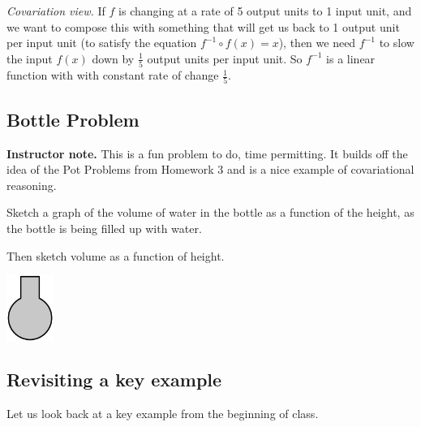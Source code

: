 \documentclass[11pt]{article}
\newcommand\smallnote[1]
	{\begin{mdframed}\raggedright  {\bf Instructor note.} {#1} \end{mdframed}}
\newenvironment{task}
	{\begin{mdframed}[linecolor=lightgray, linewidth=3pt]\raggedright}
	{\end{mdframed}}
\theoremstyle{definition}
\begin{document}
{\it Covariation view.} If $f$ is changing at a rate of 5 output units to 1 input unit, and we want to compose this with something that will get us back to 1 output unit per input unit (to satisfy the equation $f^{-1}\circ f(x)=x$), then we need $f^{-1}$ to slow the input $f(x)$ down by $\frac{1}{5}$ output units per input unit. So $f^{-1}$ is a linear function with with constant rate of change $\frac{1}{5}$.

\subsection{Bottle Problem}

\smallnote{This is a fun problem to do, time permitting. It builds off the idea of the Pot Problems from Homework 3 and is a nice example of covariational reasoning.}

\begin{task}
\begin{minipage}{5in} \raggedright \parskip4pt
Sketch a graph of the volume of water in the bottle as a function of the height, as the bottle is being filled up with water. 

Then sketch volume as a function of height. 
\end{minipage}
\begin{minipage}{1.1in}
\begin{center}
    \includegraphics[width=0.6in]{4_Bottle}
\end{center}
\end{minipage}
\end{task}

\subsection{Revisiting a key example}

Let us look back at a key example from the beginning of class. 

\begin{center}
\end{center}
\end{document}
